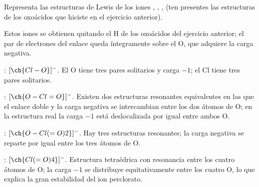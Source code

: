 \begin{exercise}
    Representa las estructuras de Lewis de los iones ,
    , , (ten presentes las estructuras de los
    oxoácidos que hiciste en el ejercicio anterior).
    \begin{solu}


        Estos iones se obtienen quitando el H de los oxoácidos del ejercicio anterior; el par de electrones del enlace  queda íntegramente sobre el O, que adquiere la carga negativa.

        \textbf{}: \([\ch{Cl-O}]^-\). El O tiene tres pares solitarios y carga \(-1\); el Cl tiene tres pares solitarios.

        \textbf{}: \([\ch{O-Cl=O}]^-\). Existen dos estructuras resonantes equivalentes en las que el enlace doble y la carga negativa se intercambian entre los dos átomos de O; en la estructura real la carga \(-1\) está deslocalizada por igual entre ambos O.

        \textbf{}: \([\ch{O-Cl(=O)2}]^-\). Hay tres estructuras resonantes; la carga negativa se reparte por igual entre los tres átomos de O.

        \textbf{}: \([\ch{Cl(=O)4}]^-\). Estructura tetraédrica con resonancia entre los cuatro átomos de O; la carga \(-1\) se distribuye equitativamente entre los cuatro O, lo que explica la gran estabilidad del ion perclorato.
    \end{solu}
\end{exercise}

